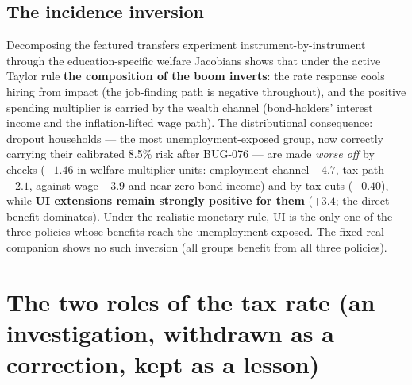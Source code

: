 \documentclass[11pt]{article}
\begin{document}
\subsection{The incidence inversion}

Decomposing the featured transfers experiment instrument-by-instrument
through the education-specific welfare Jacobians shows that under the
active Taylor rule \textbf{the composition of the boom inverts}: the
rate response cools hiring from impact (the job-finding path is negative
throughout), and the positive spending multiplier is carried by the
wealth channel (bond-holders' interest income and the inflation-lifted
wage path). The distributional consequence: dropout households --- the
most unemployment-exposed group, now correctly carrying their calibrated
8.5\% risk after BUG-076 --- are made \emph{worse off} by checks
($-1.46$ in welfare-multiplier units: employment channel $-4.7$, tax
path $-2.1$, against wage $+3.9$ and near-zero bond income) and by tax
cuts ($-0.40$), while \textbf{UI extensions remain strongly positive
for them} ($+3.4$; the direct benefit dominates). Under the realistic
monetary rule, UI is the only one of the three policies whose benefits
reach the unemployment-exposed. The fixed-real companion shows no such
inversion (all groups benefit from all three policies).

\section{The two roles of the tax rate (an investigation, withdrawn as
a correction, kept as a lesson)}
\label{sec:tau}
\end{document}
